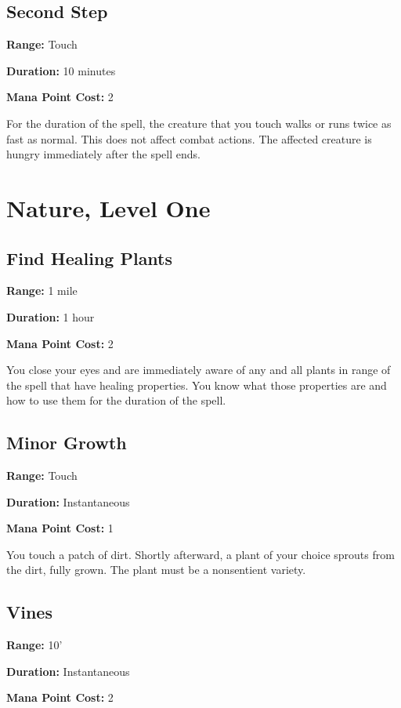 \begin{multicols}{2}
\subsection{Second Step}

\textbf{Range:} Touch

\textbf{Duration:} 10 minutes

\textbf{Mana Point Cost:} 2

For the duration of the spell, the creature that you touch walks
or runs twice as fast as normal. This does not affect combat
actions. The affected creature is hungry immediately after the
spell ends.

\section{Nature, Level One}

\subsection{Find Healing Plants}

\textbf{Range:} 1 mile

\textbf{Duration:} 1 hour

\textbf{Mana Point Cost:} 2

You close your eyes and are immediately aware of any and all plants
in range of the spell that have healing properties. You know what
those properties are and how to use them for the duration of the
spell.

\subsection{Minor Growth}

\textbf{Range:} Touch

\textbf{Duration:} Instantaneous

\textbf{Mana Point Cost:} 1

You touch a patch of dirt. Shortly afterward, a plant of your choice
sprouts from the dirt, fully grown. The plant must be a nonsentient
variety.

\subsection{Vines}

\textbf{Range:} 10'

\textbf{Duration:} Instantaneous

\textbf{Mana Point Cost:} 2


\end{multicols}
